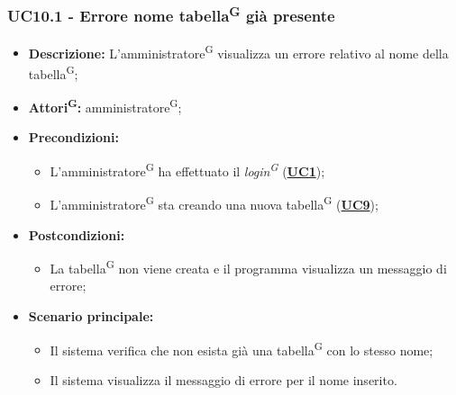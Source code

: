 \subsubsection{UC10.1 - Errore nome tabella\textsuperscript{G} già presente}
\label{sec:UC10.1}
\begin{itemize}
	\item \textbf{Descrizione:} L’amministratore\textsuperscript{G} visualizza un errore relativo al nome della tabella\textsuperscript{G};
	\item \textbf{Attori\textsuperscript{G}:} amministratore\textsuperscript{G};
	\item \textbf{Precondizioni:} 
	\begin{itemize}
		\item L’amministratore\textsuperscript{G} ha effettuato il \textit{login\textsuperscript{G}} (\hyperref[sec:UC1]{\textbf{UC1}});
		\item L’amministratore\textsuperscript{G} sta creando una nuova tabella\textsuperscript{G} (\hyperref[sec:UC9]{\textbf{UC9}});
	\end{itemize}
	\item \textbf{Postcondizioni:} 
	\begin{itemize}
		\item La tabella\textsuperscript{G} non viene creata e il programma visualizza un messaggio di errore;
	\end{itemize}
	\item \textbf{Scenario principale:} 
	\begin{itemize}
		\item Il sistema verifica che non esista già una tabella\textsuperscript{G} con lo stesso nome;
		\item Il sistema visualizza il messaggio di errore per il nome inserito.
	\end{itemize}
\end{itemize}

